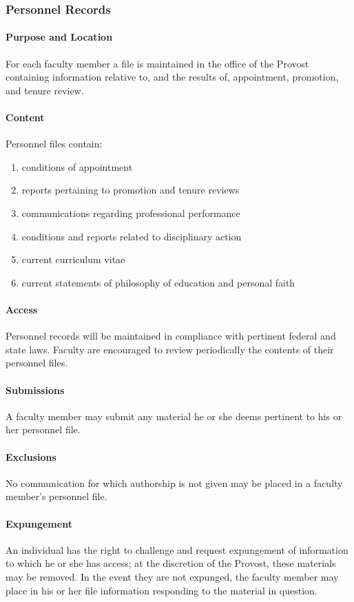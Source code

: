		\subsubsection{Personnel Records}
			\paragraph{Purpose and Location}
				For each faculty member a file is maintained in the office of the Provost containing information relative to, and the results of, appointment, promotion, and tenure review.
			\paragraph{Content}
				Personnel files contain:
				\begin{enumerate}[label=\alph*)]
					\item{conditions of appointment}
					\item{reports pertaining to promotion and tenure reviews}
					\item{communications regarding professional performance}
					\item{conditions and reports related to disciplinary action}
					\item{current curriculum vitae}
					\item{current statements of philosophy of education and personal faith}
				\end{enumerate}
			\paragraph{Access}
				Personnel records will be maintained in compliance with pertinent federal and state laws.  Faculty are encouraged to review periodically the contents of their personnel files.
			\paragraph{Submissions}
				A faculty member may submit any material he or she deems pertinent to his or her personnel file.
			\paragraph{Exclusions}
				No communication for which authorship is not given may be placed in a faculty member's personnel file.
			\paragraph{Expungement}
				An individual has the right to challenge and request expungement of information to which he or she has access; at the discretion of the Provost, these materials may be removed.  In the event they are not expunged, the faculty member may place in his or her file information responding to the material in question.
